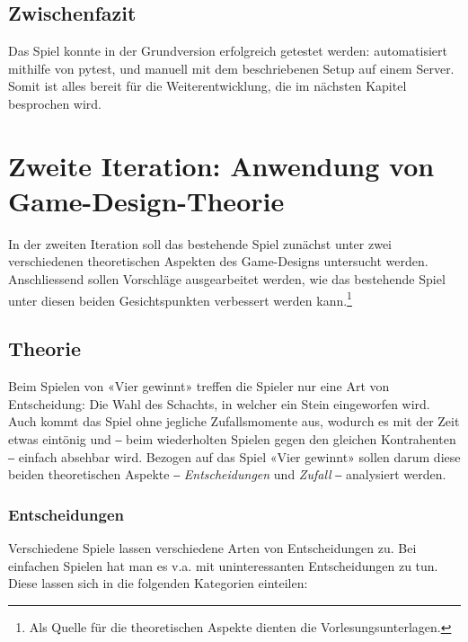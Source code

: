 \documentclass[a4paper,11pt,hidelinks]{scrartcl}
\begin{document}
\subsection{Zwischenfazit}

Das Spiel konnte in der Grundversion erfolgreich getestet werden: automatisiert mithilfe von pytest, und manuell mit dem beschriebenen Setup auf einem Server. Somit ist alles bereit für die Weiterentwicklung, die im nächsten Kapitel besprochen wird.

\newpage

\section{Zweite Iteration: Anwendung von Game-Design-Theorie}

In der zweiten Iteration soll das bestehende Spiel zunächst unter zwei verschiedenen theoretischen Aspekten des Game-Designs untersucht werden. Anschliessend sollen Vorschläge ausgearbeitet werden, wie das bestehende Spiel unter diesen beiden Gesichtspunkten verbessert werden kann.\footnote{Als Quelle für die theoretischen Aspekte dienten die Vorlesungsunterlagen.}

\subsection{Theorie}

Beim Spielen von «Vier gewinnt» treffen die Spieler nur eine Art von Entscheidung: Die Wahl des Schachts, in welcher ein Stein eingeworfen wird. Auch kommt das Spiel ohne jegliche Zufallsmomente aus, wodurch es mit der Zeit etwas eintönig und ‒ beim wiederholten Spielen gegen den gleichen Kontrahenten ‒ einfach absehbar wird. Bezogen auf das Spiel «Vier gewinnt» sollen darum diese beiden theoretischen Aspekte ‒ \textit{Entscheidungen} und \textit{Zufall} ‒ analysiert werden.

\subsubsection{Entscheidungen}

Verschiedene Spiele lassen verschiedene Arten von Entscheidungen zu. Bei einfachen Spielen hat man es v.a. mit uninteressanten Entscheidungen zu tun. Diese lassen sich in die folgenden Kategorien einteilen:
\end{document}
